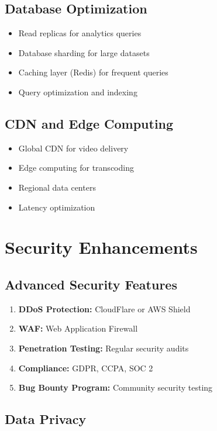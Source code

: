 \subsection{Database Optimization}

\begin{itemize}
    \item Read replicas for analytics queries
    \item Database sharding for large datasets
    \item Caching layer (Redis) for frequent queries
    \item Query optimization and indexing
\end{itemize}

\subsection{CDN and Edge Computing}

\begin{itemize}
    \item Global CDN for video delivery
    \item Edge computing for transcoding
    \item Regional data centers
    \item Latency optimization
\end{itemize}

\section{Security Enhancements}

\subsection{Advanced Security Features}

\begin{enumerate}
    \item \textbf{DDoS Protection:} CloudFlare or AWS Shield
    \item \textbf{WAF:} Web Application Firewall
    \item \textbf{Penetration Testing:} Regular security audits
    \item \textbf{Compliance:} GDPR, CCPA, SOC 2
    \item \textbf{Bug Bounty Program:} Community security testing
\end{enumerate}

\subsection{Data Privacy}

